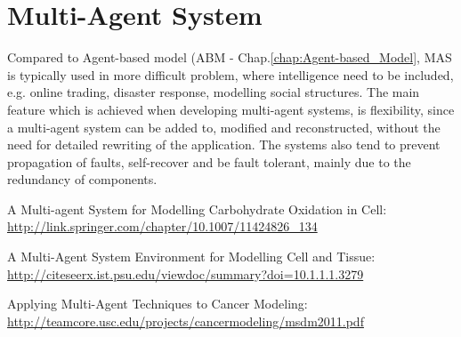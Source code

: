 \chapter{Multi-Agent System}
\label{chap:MultiAgentSystem}

Compared to Agent-based model (ABM - Chap.\ref{chap:Agent-based_Model}, MAS is
typically used in more difficult problem, where intelligence need to be
included, e.g.
online trading, disaster response, modelling social structures. The main feature
which is achieved when developing multi-agent systems, is flexibility, since a
multi-agent system can be added to, modified and reconstructed, without the need
for detailed rewriting of the application. The systems also tend to prevent
propagation of faults, self-recover and be fault tolerant, mainly due to the
redundancy of components.


A Multi-agent System for Modelling Carbohydrate Oxidation in Cell: \url{http://link.springer.com/chapter/10.1007/11424826_134}

A Multi-Agent System Environment for Modelling Cell and Tissue: \url{http://citeseerx.ist.psu.edu/viewdoc/summary?doi=10.1.1.1.3279}

Applying Multi-Agent Techniques to Cancer Modeling: \url{http://teamcore.usc.edu/projects/cancermodeling/msdm2011.pdf}
